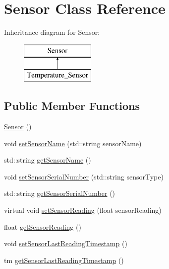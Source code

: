 \hypertarget{class_sensor}{}\section{Sensor Class Reference}
\label{class_sensor}
Inheritance diagram for Sensor\+:\begin{figure}[H]
\begin{center}
\leavevmode
\includegraphics[height=2.000000cm]{class_sensor}
\end{center}
\end{figure}
\subsection*{Public Member Functions}
\begin{DoxyCompactItemize}
\item 
\mbox{\hyperlink{class_sensor_a342d6d11ef572c8cba92cb76fb1a294b}{Sensor}} ()
\item 
void \mbox{\hyperlink{class_sensor_add1838a85fc68b6c0b61a4a233e5fcaf}{set\+Sensor\+Name}} (std\+::string sensor\+Name)
\item 
std\+::string \mbox{\hyperlink{class_sensor_aa8250e5192cfd751fad294930fabf92b}{get\+Sensor\+Name}} ()
\item 
void \mbox{\hyperlink{class_sensor_a59ad3f638a81e29a9fac3526be948ce5}{set\+Sensor\+Serial\+Number}} (std\+::string sensor\+Type)
\item 
std\+::string \mbox{\hyperlink{class_sensor_ad59209d7c8aed356ba8aa2ff832c37cc}{get\+Sensor\+Serial\+Number}} ()
\item 
virtual void \mbox{\hyperlink{class_sensor_aa89b192e3203c85e62599c6239f01225}{set\+Sensor\+Reading}} (float sensor\+Reading)
\item 
float \mbox{\hyperlink{class_sensor_a399de2e826af7fe32a579f93dbfad1b2}{get\+Sensor\+Reading}} ()
\item 
void \mbox{\hyperlink{class_sensor_ab6e5cf0accf41d18ddb4dc9e489ba1ef}{set\+Sensor\+Last\+Reading\+Timestamp}} ()
\item 
tm \mbox{\hyperlink{class_sensor_a7a14fc550fd1c126f256925d07214d27}{get\+Sensor\+Last\+Reading\+Timestamp}} ()
\end{DoxyCompactItemize}
